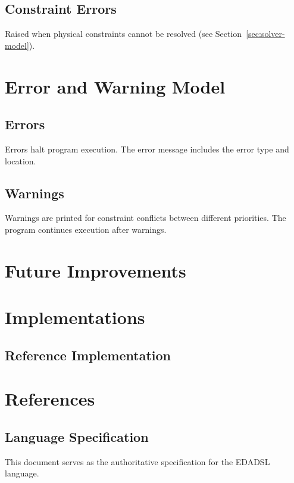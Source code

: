 \documentclass{report}
\begin{document}
\section{Constraint Errors}
Raised when physical constraints cannot be resolved (see Section~\ref{sec:solver-model}).


\chapter{Error and Warning Model}

\section{Errors}
Errors halt program execution. The error message includes the error type and location.

\section{Warnings}
Warnings are printed for constraint conflicts between different priorities. The program continues execution after warnings.


\chapter{Future Improvements}


\chapter{Implementations}

\section{Reference Implementation}


\chapter{References}

\section{Language Specification}
This document serves as the authoritative specification for the EDADSL language.
\end{document}
